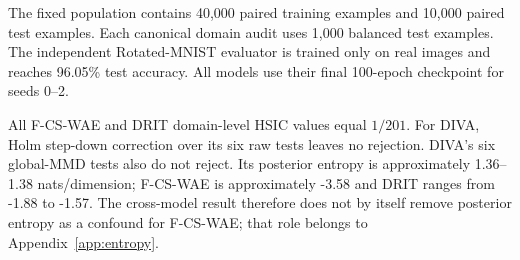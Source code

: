 The fixed population contains 40,000 paired training examples and 10,000
paired test examples.  Each canonical domain audit uses 1,000 balanced test
examples.  The independent Rotated-MNIST evaluator is trained only on real
images and reaches 96.05\% test accuracy.  All models use their final
100-epoch checkpoint for seeds 0--2.

\begin{table}[ht]
\caption{Per-seed native cross-model results, macro-averaged over the two
domains.  Probe, content, and retention values are percentages.}
\label{tab:cross-model-seeds}
\centering
\scriptsize
\setlength{\tabcolsep}{3pt}
\end{table}

All F-CS-WAE and DRIT domain-level HSIC values equal $1/201$.  For DIVA, Holm
step-down correction over its six raw tests leaves no rejection.  DIVA's six
global-MMD tests also do not reject.  Its posterior entropy is approximately
1.36--1.38 nats/dimension; F-CS-WAE is approximately -3.58 and DRIT ranges
from -1.88 to -1.57.  The cross-model result therefore does not by itself
remove posterior entropy as a confound for F-CS-WAE; that role belongs to
Appendix~\ref{app:entropy}.

